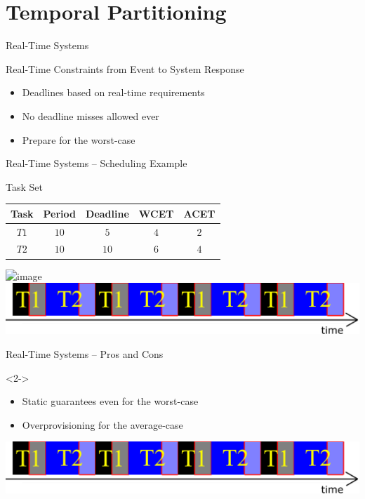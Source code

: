 \section{Temporal Partitioning}


\begin{frame}{Real-Time Systems}

\pause
\begin{block}{Real-Time Constraints from Event to System Response}
\pause
\begin{itemize}[<+->]
    \item Deadlines based on real-time requirements
    \item No deadline misses allowed ever
    \item Prepare for the worst-case
\end{itemize}
\end{block}

\end{frame}


\begin{frame}{Real-Time Systems -- Scheduling Example}

\begin{block}{Task Set}
\begin{tabular}{cccc<{\onslide<3->}c<{\onslide}}
\textbf{Task}&\textbf{Period}&\textbf{Deadline}&\textbf{WCET}&\textbf{ACET}\\ \hline
$T1$&$10$&$5$&$4$&$2$\\
$T2$&$10$&$10$&$6$&$4$
\end{tabular}
\end{block}

\vfill

\includegraphics<2-3>[width=\textwidth]{Figures/real-time-sched-1}
\includegraphics<4>[width=\textwidth]{Figures/real-time-sched-2}

\end{frame}

\begin{frame}{Real-Time Systems -- Pros and Cons}

\begin{block}{}<2->
    \begin{itemize}
        \item<2-> Static guarantees even for the worst-case
        \item<3-> Overprovisioning for the average-case 
    \end{itemize}
\end{block}

\vfill

\includegraphics[width=\textwidth]{Figures/real-time-sched-2}


\end{frame}



